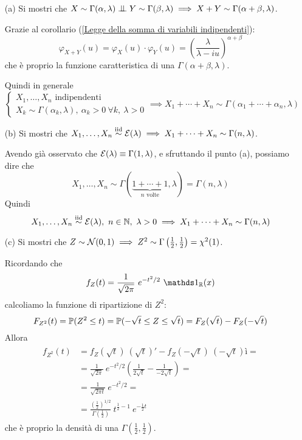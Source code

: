 \begin{enumerate}

\item [(a)] Si mostri che $X\sim\Gamma(\alpha,\lambda)\indep Y\sim\Gamma(\beta,\lambda)\implies X+Y\sim\Gamma(\alpha+\beta,\lambda)$.

Grazie al corollario (\ref{Legge della somma di variabili indipendenti}):
\[
\varphi_{X+Y}(u)=\varphi_X(u)\cdot\varphi_Y(u)=\left(\frac{\lambda}{\lambda-iu}\right)^{\alpha+\beta}
\]
che è proprio la funzione caratteristica di una $\Gamma(\alpha+\beta,\lambda)$.

Quindi in generale
\[
\begin{cases}X_1,\dots,X_n\text{ indipendenti}\\X_k\sim\Gamma(\alpha_k,\lambda),\ \alpha_k>0\ \forall k,\ \lambda>0\end{cases} \implies X_1+\cdots+X_n\sim\Gamma(\alpha_1+\cdots+\alpha_n,\lambda)
\]

\item [(b)] Si mostri che $X_1,\dots,X_n\stackrel{\mathrm{iid}}{\sim}\mathcal{E}(\lambda)\implies X_1+\cdots+X_n\sim\Gamma(n,\lambda)$.

Avendo già osservato che $\mathcal{E}(\lambda)\equiv\Gamma(1,\lambda)$, e sfruttando il punto (a), possiamo dire che
\[
X_1,\dots,X_n\sim\Gamma(\underbrace{1+\cdots+1}_{n\text{ volte}},\lambda)=\Gamma(n,\lambda)
\]
Quindi
\[
X_1,\dots,X_n\iid\Ec(\lambda),\ n\in\NN,\ \lambda>0\implies X_1+\cdots+X_n\sim\Gamma(n,\lambda)
\]

\item [(c)] Si mostri che $Z\sim\mathcal{N}(0,1)\implies Z^2\sim\Gamma\left(\frac{1}{2},\frac{1}{2}\right)=\chi^2(1)$.

Ricordando che
\[
f_Z(t)=\frac{1}{\sqrt{2\pi}}\ e^{-t^2/2}\ \Ind_\RR(x)
\]
calcoliamo la funzione di ripartizione di $Z^2$:
\[
F_{Z^2}(t)=\mathbb{P}(Z^2\leq t)=\mathbb{P}(-\sqrt{t}\leq Z\leq\sqrt{t})=F_Z(\sqrt{t})-F_Z(-\sqrt{t})
\]
Allora
\begin{gather*}
\begin{aligned}
f_{Z^2}(t)&=f_Z(\sqrt{t})\ (\sqrt{t})'-f_Z(-\sqrt{t})\ (-\sqrt{t})ì=\\
&=\frac{1}{\sqrt{2\pi}}\ e^{-t^2/2}\left(\frac{1}{2\sqrt{t}}-\frac{1}{-2\sqrt{t}}  \right)=\\
&=\frac{1}{\sqrt{2\pi t}}\ e^{-t^2/2}=\\
&=\frac{\left( \frac{1}{2}  \right)^{1/2}}{\Gamma\left( \frac{1}{2}  \right)}\ t^{\frac{1}{2}-1}\ e^{-\frac{1}{2}t}
\end{aligned}
\end{gather*}
che è proprio la densità di una $\Gamma\left(\frac{1}{2},\frac{1}{2} \right)$.


\end{enumerate}
